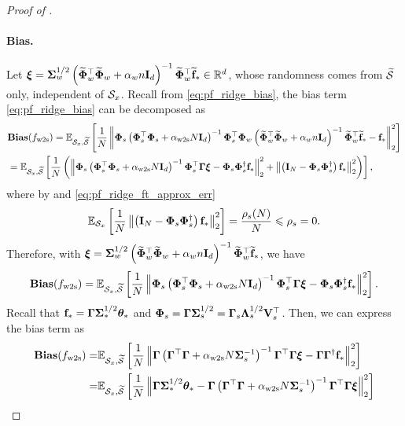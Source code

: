 \begin{proof}[Proof of ]
    \paragraph{Bias.}
    Let $\xib = \Sigmab_w^{1/2} \rbr{\wt\Phib_w^\top \wt\Phib_w + \alpha_w n \Ib_d}^{-1} \wt\Phib_w^\top \wt\fb_* \in \R^d$, whose randomness comes from $\wt\Scal$ only, independent of $\Scal_x$.
    Recall from \eqref{eq:pf_ridge_bias}, the bias term \eqref{eq:pf_ridge_bias} can be decomposed as
    \begin{align*}
        &\bias(f_\wts) = \E_{\Scal_x, \wt\Scal}\sbr{\frac{1}{N} \nbr{\Phib_s \rbr{\Phib_s^\top \Phib_s + \alpha_\wts N \Ib_d}^{-1} \Phib_s^\top \Phib_w \rbr{\wt\Phib_w^\top \wt\Phib_w + \alpha_w n \Ib_d}^{-1} \wt\Phib_w^\top \wt\fb_* - \fb_*}_2^2}\\
        &= \E_{\Scal_x, \wt\Scal}\sbr{\frac{1}{N} \rbr{\nbr{\Phib_s \rbr{\Phib_s^\top \Phib_s + \alpha_\wts N \Ib_d}^{-1} \Phib_s^\top \Gammab \xib - \Phib_s \Phib_s^\dagger \fb_*}_2^2 + \nbr{\rbr{\Ib_N - \Phib_s \Phib_s^\dagger} \fb_*}_2^2}},
    \end{align*}
    where by  and \eqref{eq:pf_ridge_ft_approx_err}
    \begin{align*}
        \E_{\Scal_x}\sbr{\frac{1}{N} \nbr{\rbr{\Ib_N - \Phib_s \Phib_s^\dagger} \fb_*}_2^2}
        = \frac{\rho_s(N)}{N} \le \rho_s = 0.
    \end{align*}
    Therefore, with $\xib = \Sigmab_w^{1/2} \rbr{\wt\Phib_w^\top \wt\Phib_w + \alpha_w n \Ib_d}^{-1} \wt\Phib_w^\top \wt\fb_*$, we have
    \begin{align*}
        \bias(f_\wts) = \E_{\Scal_x, \wt\Scal}\sbr{\frac{1}{N} \nbr{\Phib_s \rbr{\Phib_s^\top \Phib_s + \alpha_\wts N \Ib_d}^{-1} \Phib_s^\top \Gammab \xib - \Phib_s \Phib_s^\dagger \fb_*}_2^2}.
    \end{align*}
    Recall that $\fb_* = \Gammab \Sigmab_*^{1/2} \thetab_*$ and $\Phib_s = \Gammab \Sigmab_s^{1/2} = \Gammab_s \Lambdab_s^{1/2} \Vb_s^\top$.
    Then, we can express the bias term as
    \begin{align*}
        \bias(f_\wts) = &\E_{\Scal_x, \wt\Scal}\sbr{\frac{1}{N} \nbr{\Gammab\rbr{\Gammab^\top \Gammab + \alpha_\wts N \Sigmab_s^{-1}}^{-1} \Gammab^\top \Gammab \xib - \Gammab \Gammab^\dagger \fb_*}_2^2} \\
        = &\E_{\Scal_x, \wt\Scal}\sbr{\frac{1}{N} \nbr{\Gammab \Sigmab_*^{1/2} \thetab_* - \Gammab\rbr{\Gammab^\top \Gammab + \alpha_\wts N \Sigmab_s^{-1}}^{-1} \Gammab^\top \Gammab \xib}_2^2} \\

\end{align*}
\end{proof}

